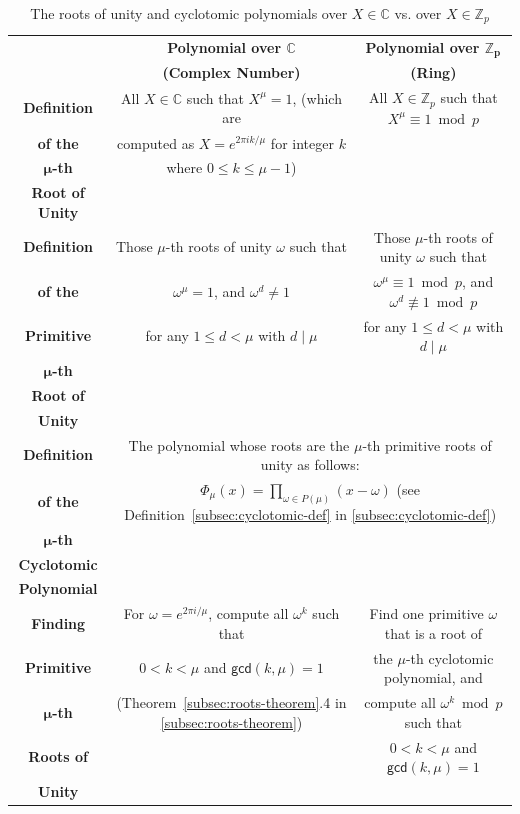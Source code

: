 \begin{table}[h] %
\begin{tabular}{|c||c||c|}
\hline \hline
& \textbf{Polynomial over $\bm{\mathbb{C}}$} & \textbf{Polynomial over $\bm{\mathbb{Z}}_{\bm{p}}$} \\ 
& \textbf{(Complex Number)} & \textbf{(Ring)} \\ \hline \hline
\textbf{Definition}&All $X \in \mathbb{C}$ such that $X^\mu = 1$, (which are&All $X \in \mathbb{Z}_p$ such that $X^\mu \equiv 1 \bmod p$\\
\textbf{of the}&computed as $X = e^{2 \pi i k / \mu}$ for integer $k$&\\
\textbf{$\bm \mu$-th}&where $0 \leq k \leq \mu - 1$)&\\
\textbf{Root of Unity}&&\\\hline
\textbf{Definition}&Those $\mu$-th roots of unity $\omega$ such that&Those $\mu$-th roots of unity $\omega$ such that\\
\textbf{of the}&$\omega^{\mu} = 1$, and $\omega^{d} \neq 1$ &$\omega^{\mu} \equiv 1 \bmod p$, and $\omega^{d} \not\equiv 1 \bmod p$\\
\textbf{Primitive}&for any $1 \le d < \mu$ with $d \mid \mu$&for any $1 \le d < \mu$ with $d \mid \mu$\\
\textbf{$\bm \mu$-th}&&\\
\textbf{Root of}&&\\
\textbf{Unity}&&\\\hline
\textbf{Definition}&\multicolumn{2}{|c|}{The polynomial whose roots are the $\mu$-th primitive roots of unity as follows:}\\
\textbf{of the}&\multicolumn{2}{|c|}{$ \Phi_{\mu}(x) = \prod_{\omega \in P(\mu)} (x - \omega) $  \text{ } (see Definition~\ref*{subsec:cyclotomic-def} in \autoref{subsec:cyclotomic-def})}\\
\textbf{$\bm \mu$-th}&\multicolumn{2}{|c|}{}\\
\textbf{Cyclotomic}&\multicolumn{2}{|c|}{}\\
\textbf{Polynomial}&\multicolumn{2}{|c|}{}\\\hline
\textbf{Finding}&For $\omega = e^{2 \pi i/ \mu}$, compute all ${\omega}^k$ such that&Find one primitive $\omega$ that is a root of\\
\textbf{Primitive}&$0 < k < \mu $ and $\textsf{gcd}(k, \mu) = 1$&the $\mu$-th cyclotomic polynomial, and\\
\textbf{$\bm \mu$-th}&(Theorem~\ref*{subsec:roots-theorem}.4 in \autoref{subsec:roots-theorem})&compute all $\omega^k \bmod p$ such that\\
\textbf{Roots of}&&$0 < k < \mu $ and $\textsf{gcd}(k, \mu) = 1$\\
\textbf{Unity}&&\\\hline\hline
\end{tabular}
\caption{The roots of unity and cyclotomic polynomials over $X \in \mathbb{C}$ vs. over $X \in \mathbb{Z}_p$}
\label{tab:cyclotomic-polynomial-comparison}
\end{table}


